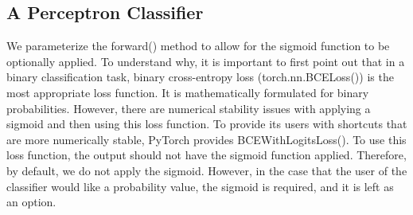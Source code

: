\subsection{A Perceptron Classifier}
We parameterize the forward() method to allow for the sigmoid function to be
optionally applied. To understand why, it is important to first point out that in a
binary classification task, binary cross-entropy loss (\textsf{torch.nn.BCELoss()}) is the
most appropriate loss function. It is mathematically formulated for binary probabilities. However, there are numerical stability issues with applying a sigmoid and then
using this loss function. To provide its users with shortcuts that are more numerically
stable, PyTorch provides \textsf{BCEWithLogitsLoss()}. To use this loss function, the output
should not have the sigmoid function applied. Therefore, by default, we do not apply
the sigmoid. However, in the case that the user of the classifier would like a probability value, the sigmoid is required, and it is left as an option.